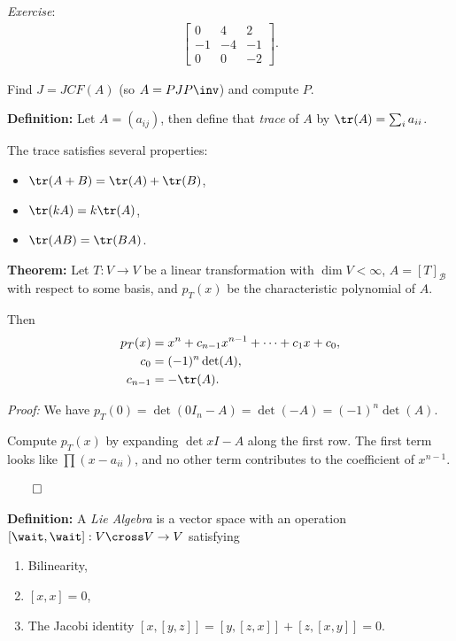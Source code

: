 \emph{Exercise}: \begin{align*}
\left[\begin{array}{ccc}
0 & 4 & 2 \\
-1 & -4 & -1 \\
0 & 0 & -2
\end{array}\right]
.\end{align*}

Find \(J = JCF(A)\) (so \(A = PJP\inv\)) and compute \(P\).

\textbf{Definition:} Let \(A = (a_{ij})\), then define that \emph{trace}
of \(A\) by \(\tr(A) = \sum_i a_{ii}\).

The trace satisfies several properties:

\begin{itemize}
\item
  \(\tr(A+B) = \tr(A) + \tr(B)\),
\item
  \(\tr(kA) = k\tr(A)\),
\item
  \(\tr(AB) = \tr(BA)\).
\end{itemize}

\textbf{Theorem:} Let \(T: V\to V\) be a linear transformation with
\(\dim V < \infty\), \(A = [T]_{\mathcal{B}}\) with respect to some
basis, and \(p_T(x)\) be the characteristic polynomial of \(A\).

Then \begin{align*}
p_T(x) &= x^n + c_{n-1}x^{n-1} + \cdots + c_1 x + c_0, \\
c_0 &= (-1)^n \det(A), \\
c_{n-1} &= -\tr(A)
.\end{align*}

\emph{Proof:} We have
\(p_T(0) = \det(0 I_n - A) = \det(-A) = (-1)^n \det(A)\).

Compute \(p_T(x)\) by expanding \(\det{xI - A}\) along the first row.
The first term looks like \(\prod (x-a_{ii})\), and no other term
contributes to the coefficient of \(x^{n-1}\).

\(\qed\)

\textbf{Definition:} A \emph{Lie Algebra} is a vector space with an
operation \([\wait, \wait]: V\cross V \to V\) satisfying

\begin{enumerate}
\def\labelenumi{\arabic{enumi}.}
\item
  Bilinearity,
\item
  \([x, x] = 0\),
\item
  The Jacobi identity \([x, [y, z]] = [y, [z, x]] + [z, [x, y]] = 0\).
\end{enumerate}

